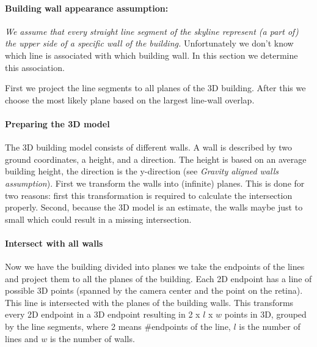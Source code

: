 	\paragraph{Building wall appearance assumption:}
	\emph{We assume that every straight line segment of the skyline represent (a part of) the upper side of a specific wall of the building.}
	Unfortunately we don't know which line is associated with which building
	wall. In this section we determine this association.

	First we project the line segments to all planes of the 3D building.  After
	this we choose the most likely plane based on the largest line-wall overlap. 

	\paragraph{Preparing the 3D model}
	The 3D building model consists of different walls. A wall is described by
	two ground coordinates, a height, and a direction.
	The height is based on an average building height, the direction is the
	y-direction (see \emph{Gravity aligned walls assumption}).
	First we transform the walls into (infinite) planes.  This is done for two
	reasons: first this transformation is required to calculate the intersection
	properly. Second, because the 3D model is an estimate, the walls maybe just
	to small which could result in a missing intersection. \\


	\paragraph{Intersect with all walls}
	Now we have the building divided  into planes we take the endpoints of the
	lines and project them to all the planes of the building.  Each 2D endpoint
	has a line of possible 3D points (spanned by the camera center and the point
	on the retina). This line is intersected with the planes of the building
	walls.  This transforms every 2D endpoint in a 3D endpoint resulting in 2 x
	$l$ x $w$ points in 3D, grouped by the line segments, where 2 means
	\#endpoints of the line, $l$ is the number of lines and $w$ is the number of
	walls.\\

